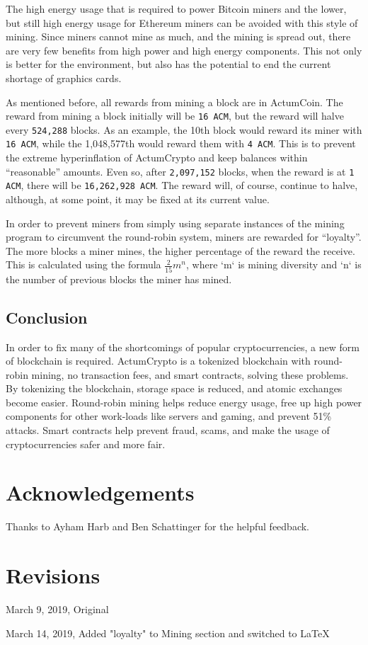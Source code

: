 \documentclass[letter]{article}
\begin{document}
The high energy usage that is required to power Bitcoin miners and the lower, but still high energy usage for Ethereum miners can be avoided with this style of mining. Since miners cannot mine as much, and the mining is spread out, there are very few benefits from high power and high energy components. This not only is better for the environment, but also has the potential to end the current shortage of graphics cards.

As mentioned before, all rewards from mining a block are in ActumCoin. The reward from mining a block initially will be \texttt{16 ACM}, but the reward will halve every \texttt{524,288} blocks. As an example, the 10th block would reward its miner with \texttt{16 ACM}, while the 1,048,577th would reward them with \texttt{4 ACM}. This is to prevent the extreme hyperinflation of ActumCrypto and keep balances within “reasonable” amounts. Even so, after \texttt{2,097,152} blocks, when the reward is at \texttt{1 ACM}, there will be \texttt{16,262,928 ACM}. The reward will, of course, continue to halve, although, at some point, it may be fixed at its current value.

In order to prevent miners from simply using separate instances of the mining program to circumvent the round-robin system, miners are rewarded for “loyalty”. The more blocks a miner mines, the higher percentage of the reward the receive. This is calculated using the formula $\frac{2}{15}m^{n}$, where `m` is mining diversity and `n` is the number of previous blocks the miner has mined. 
\subsection{Conclusion}
In order to fix many of the shortcomings of popular cryptocurrencies, a new form of blockchain is required. ActumCrypto is a tokenized blockchain with round-robin mining, no transaction fees, and smart contracts, solving these problems. By tokenizing the blockchain, storage space is reduced, and atomic exchanges become easier. Round-robin mining helps reduce energy usage, free up high power components for other work-loads like servers and gaming, and prevent 51\% attacks. Smart contracts help prevent fraud, scams, and make the usage of cryptocurrencies safer and more fair.
\pagebreak

\section{Acknowledgements}
Thanks to Ayham Harb and Ben Schattinger for the helpful feedback.

\section{Revisions}
March 9, 2019, Original

March 14, 2019, Added "loyalty" to Mining section and switched to LaTeX

\newpage
\printbibliography
\end{document}
